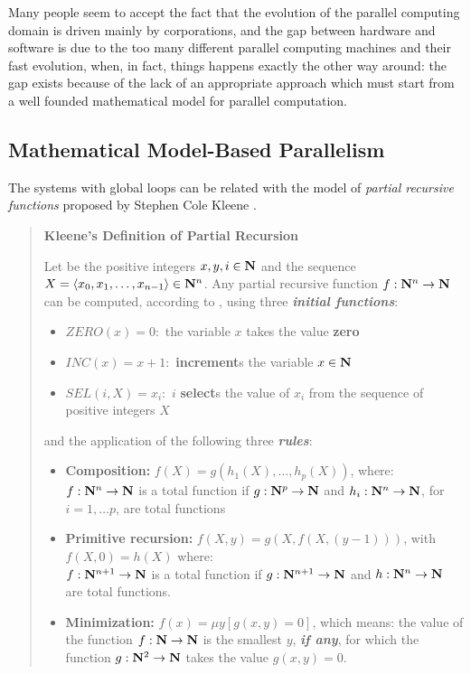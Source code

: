 Many people seem to accept the fact that the evolution of the parallel computing domain is  driven mainly  by corporations, and the gap between hardware and software is due to the too many  different parallel computing machines and their fast evolution, when, in fact, things happens exactly the other way around: the gap exists because of the lack of an appropriate approach which must start from a well founded mathematical model for parallel computation.



\subsection{Mathematical Model-Based Parallelism}



The systems with global loops can be related with the model of {\em partial recursive functions} proposed by Stephen Cole Kleene \citep{Kleene36}.
{\small
\begin{shaded*}
\begin{quote}
{\bf Kleene's Definition of Partial Recursion}

Let be the positive integers $x,y,i \in {\bf N}$ and the sequence $X = \langle x_0, x_1, \ldots, x_{n-1} \rangle \in {\bf N}^n$. Any partial recursive function $f: {\bf N}^n \rightarrow {\bf N}$ can be computed, according to \citep{Kleene36}, using three {\bf {\em initial functions}}:
\begin{itemize}
\item $ZERO(x) = 0:$ the variable $x$ takes the value {\bf zero}
\item $INC(x) = x+1:$ {\bf increment}s the variable $x \in {\bf N}$
\item $SEL(i, X) = x_i:$ $i$ {\bf select}s the value of $x_i$ from the sequence of positive integers $X$
\end{itemize}
and the application of the following three {\bf {\em rules}}:
\begin{itemize}
\item {\bf Composition:}  $f(X) = g(h_1(X), \ldots, h_p(X))$,
    where:  $f: {\bf N}^n \rightarrow {\bf N}$ is a total function if  $g: {\bf N}^p \rightarrow {\bf N}$ and  $h_i: {\bf N}^n \rightarrow {\bf N}$, for $i = 1, \ldots p$, are total functions
\item {\bf Primitive recursion:} $f(X,y) = g(X, f(X, (y-1)))$,  with $f(X,0) = h(X)$
    where: \\ $f:  {\bf N}^{n+1} \rightarrow  {\bf N}$ is a total function if $g:  {\bf N}^{n+1} \rightarrow  {\bf N}$ and $h:  {\bf N}^n \rightarrow  {\bf N}$ are total functions.
\item {\bf Minimization:} $f(x) = \mu y[g(x,y) = 0]$,
    which means: the value of the function  $f:  {\bf N} \rightarrow  {\bf N}$ is the smallest $y$, {\bf {\em if any}}, for which the function $g:  {\bf N}^2 \rightarrow  {\bf N}$ takes the value $g(x,y) = 0$.
\end{itemize}
\end{quote}
\end{shaded*}
}
